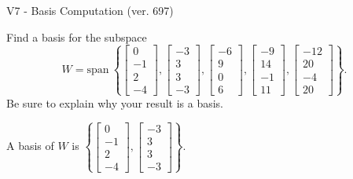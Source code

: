 \begin{exercise}
  \begin{exerciseTitle}V7 - Basis Computation (ver. 697)\end{exerciseTitle}
  \begin{exerciseStatement}
    Find a basis for the subspace 
\[W=\mathrm{span}\ \left\{\left[\begin{array}{r}
0 \\
-1 \\
2 \\
-4
\end{array}\right] , \left[\begin{array}{r}
-3 \\
3 \\
3 \\
-3
\end{array}\right] , \left[\begin{array}{r}
-6 \\
9 \\
0 \\
6
\end{array}\right] , \left[\begin{array}{r}
-9 \\
14 \\
-1 \\
11
\end{array}\right] , \left[\begin{array}{r}
-12 \\
20 \\
-4 \\
20
\end{array}\right]\right\}.\]
 Be sure to explain why your result is a basis.


  \end{exerciseStatement}
  \begin{exerciseAnswer}
   A basis of \(W\) is  \(\left\{\left[\begin{array}{r}
0 \\
-1 \\
2 \\
-4
\end{array}\right] , \left[\begin{array}{r}
-3 \\
3 \\
3 \\
-3
\end{array}\right]\right\}\).
  


  \end{exerciseAnswer}
\end{exercise}